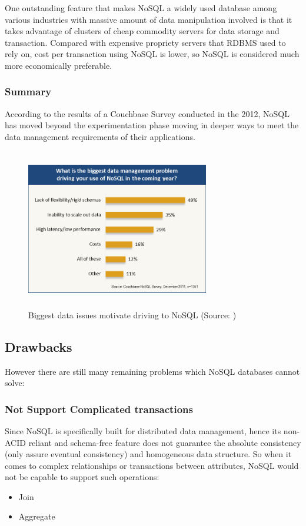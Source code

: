 One outstanding feature that makes NoSQL a widely used database among various industries with massive amount of data manipulation involved is that it takes advantage of clusters of cheap commodity servers for data storage and transaction.
Compared with expensive propriety servers that RDBMS used to rely on, cost per transaction using NoSQL is lower, so NoSQL is considered much more economically preferable.  


\subsubsection{Summary}\mbox{}

According to the results of a Couchbase Survey conducted in the 2012,  NoSQL has moved beyond the experimentation phase moving in deeper ways to meet the data management requirements of their applications\cite{drive}.

\begin{figure}[H]
	\includegraphics[height=7cm, width=8cm]{../../../images/drive.png}
	\caption{Biggest data issues motivate driving to NoSQL (Source: \cite{drive})}
\end{figure}

\subsection{Drawbacks}

However there are still many remaining problems which NoSQL
databases cannot solve:

\subsubsection{Not Support Complicated transactions}\mbox{}

Since NoSQL is specifically built for distributed data management, hence its non-ACID reliant  and schema-free  feature  does not guarantee the absolute consistency (only assure eventual consistency) and homogeneous data structure. So when it comes to complex relationships or transactions between attributes, NoSQL would not be capable to support such operations:
\begin{itemize}
	\item Join
	\item Aggregate
\end{itemize}

